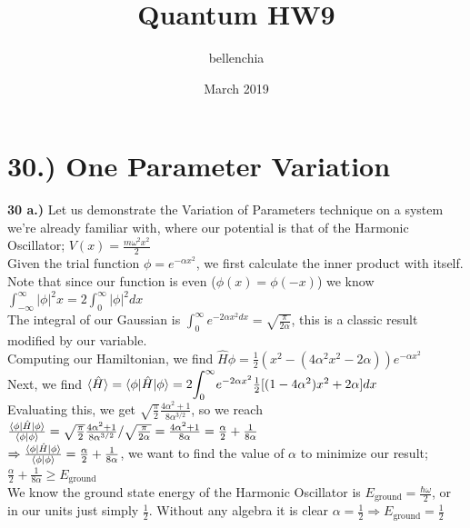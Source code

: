 \documentclass[12pt]{article}
\title{Quantum HW9}
\author{bellenchia}
\date{March 2019}
\begin{document}
\maketitle

\section*{30.) One Parameter Variation}
\textbf{30 a.)}
Let us demonstrate the Variation of Parameters technique on a system we're already familiar with, where our potential is that of the Harmonic Oscillator; $V(x)=\frac{m\omega^2x^2}{2}$\\
Given the trial function $\phi=e^{-\alpha x^2}$, we first calculate the inner product with itself. \\

Note that since our function is even ($ \phi(x)=\phi(-x) $) we know ${\displaystyle\int_{-\infty}^\infty}|\phi|^2x=2{\displaystyle\int_0^\infty}|\phi|^2 dx$\\

The integral of our Gaussian is $ {\displaystyle\int_0^\infty} e^{-2\alpha x^2 dx}=\sqrt{\frac{\pi}{2\alpha}}$, this is a classic result modified by our variable.\\

Computing our Hamiltonian, we find $\hat{H}\phi=\frac{1}{2}(x^2-(4\alpha^2x^2-2\alpha))e^{-\alpha x^2}$\\

Next, we find $\braket{\hat{H}}=\braket{\phi|\hat{H}|\phi}=2{\displaystyle\int_{0}^\infty}e^{-2\alpha x^2}\frac{1}{2}[(1-4\alpha^2)x^2+2\alpha]dx$\\

Evaluating this, we get $\sqrt{\frac{\pi}{2}}\frac{4\alpha^2+1}{8\alpha^{3/2}}$, so we reach $\frac{\braket{\phi|\hat{H}|\phi}}{\braket{\phi|\phi}}= \sqrt{\frac{\pi}{2}}\frac{4\alpha^2+1}{8\alpha^{3/2}} / \sqrt{\frac{\pi}{2\alpha}}=\frac{4\alpha^2+1}{8\alpha}=\frac{\alpha}{2}+\frac{1}{8\alpha}$\\

$\Rightarrow\frac{\braket{\phi|\hat{H}|\phi}}{\braket{\phi|\phi}}=\frac{\alpha}{2}+\frac{1}{8\alpha}$, we want to find the value of $\alpha$ to minimize our result; $\frac{\alpha}{2}+\frac{1}{8\alpha}\geq E_{\text{ground}}$\\

We know the ground state energy of the Harmonic Oscillator is $E_{\text{ground}}=\frac{\hbar\omega}{2}$, or in our units just simply $\frac12$. Without any algebra it is clear $\alpha=\frac{1}{2}\Rightarrow E_{\text{ground}}=\frac{1}{2}$\\
\end{document}
